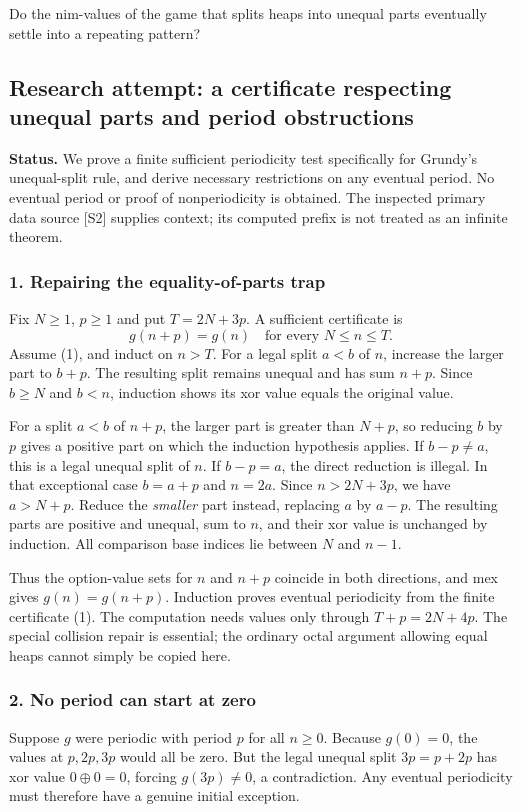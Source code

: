 \documentclass[11pt,a4paper]{article}
\begin{document}
Do the nim-values of the game that splits heaps into unequal parts eventually settle into a repeating pattern?

\subsection{Research attempt: a certificate respecting unequal parts and period obstructions}
\textbf{Status.} We prove a finite sufficient periodicity test specifically for Grundy's unequal-split rule, and derive necessary restrictions on any eventual period. No eventual period or proof of nonperiodicity is obtained. The inspected primary data source [S2] supplies context; its computed prefix is not treated as an infinite theorem.

\subsubsection{1. Repairing the equality-of-parts trap}
Fix $N\geq1$, $p\geq1$ and put $T=2N+3p$. A sufficient certificate is
\[g(n+p)=g(n)\quad\text{for every }N\leq n\leq T.\tag{1}\]
Assume (1), and induct on $n>T$. For a legal split $a<b$ of $n$, increase the larger part to $b+p$. The resulting split remains unequal and has sum $n+p$. Since $b\geq N$ and $b<n$, induction shows its xor value equals the original value.

For a split $a<b$ of $n+p$, the larger part is greater than $N+p$, so reducing $b$ by $p$ gives a positive part on which the induction hypothesis applies. If $b-p\ne a$, this is a legal unequal split of $n$. If $b-p=a$, the direct reduction is illegal. In that exceptional case $b=a+p$ and $n=2a$. Since $n>2N+3p$, we have $a>N+p$. Reduce the \emph{smaller} part instead, replacing $a$ by $a-p$. The resulting parts are positive and unequal, sum to $n$, and their xor value is unchanged by induction. All comparison base indices lie between $N$ and $n-1$.

Thus the option-value sets for $n$ and $n+p$ coincide in both directions, and mex gives $g(n)=g(n+p)$. Induction proves eventual periodicity from the finite certificate (1). The computation needs values only through $T+p=2N+4p$. The special collision repair is essential; the ordinary octal argument allowing equal heaps cannot simply be copied here.

\subsubsection{2. No period can start at zero}
Suppose $g$ were periodic with period $p$ for all $n\geq0$. Because $g(0)=0$, the values at $p,2p,3p$ would all be zero. But the legal unequal split $3p=p+2p$ has xor value $0\oplus0=0$, forcing $g(3p)\ne0$, a contradiction. Any eventual periodicity must therefore have a genuine initial exception.
\end{document}
